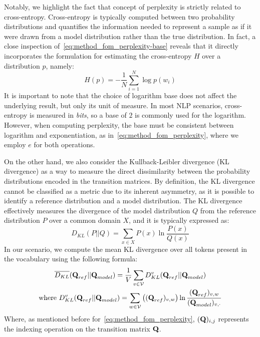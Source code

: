 Notably, we highlight the fact that concept of perplexity is strictly related to cross-entropy.
Cross-entropy is typically computed between two probability distributions and quantifies the information needed to represent a sample as if it were drawn from a model distribution rather than the true distribution.
In fact, a close inspection of~\cref{eq:method_fom_perplexity-base} reveals that it directly incorporates the formulation for estimating the cross-entropy $H$ over a distribution $p$, namely:
\begin{equation*}
    H(p) = - \frac{1}{N}\sum_{i=1}^{N}{\log{p(w_i)}}
\end{equation*}
It is important to note that the choice of logarithm base does not affect the underlying result, but only its unit of measure.
In most NLP scenarios, cross-entropy is measured in \emph{bits}, so a base of $2$ is commonly used for the logarithm.
However, when computing perplexity, the base must be consistent between logarithm and exponentiation, as in~\cref{eq:method_fom_perplexity}, where we employ $e$ for both operations.

On the other hand, we also consider the Kullback-Leibler divergence (KL divergence) as a way to measure the direct dissimilarity between the probability distributions encoded in the transition matrices.
By definition, the KL divergence cannot be classified as a metric due to its inherent asymmetry, as it is possible to identify a reference distribution and a model distribution.
The KL divergence effectively measures the divergence of the model distribution $Q$ from the reference distribution $P$ over a common domain $X$, and it is typically expressed as:
\begin{equation*}
    D_{KL}(P||Q) = \sum_{x \in X}{P(x)\ln{\frac{P(x)}{Q(x)}}}
\end{equation*}
In our scenario, we compute the mean KL divergence over all tokens present in the vocabulary using the following formula:
\begin{equation}
    \label{eq:method_fom_kldiv}
    \begin{gathered}
    {\overline {D_{KL}}}(\bm{\mathbf{Q}}_{ref} || \bm{\mathbf{Q}}_{model}) = \frac{1}{V}\sum_{v \in \mathcal{V}}{D_{KL}^v(\bm{\mathbf{Q}}_{ref} || \bm{\mathbf{Q}}_{model})} \\
    \text{where}\ D_{KL}^v(\bm{\mathbf{Q}}_{ref} || \bm{\mathbf{Q}}_{model}) = \sum_{w \in \mathcal{V}}{\bigl((\bm{\mathbf{Q}}_{ref})_{v,w}\bigr)\ln{\frac{(\bm{\mathbf{Q}}_{ref})_{v,w}}{(\bm{\mathbf{Q}}_{model})_{v,\cdot}}}}
    \end{gathered}
\end{equation}
Where, as mentioned before for~\cref{eq:method_fom_perplexity}, $(\bm{\mathbf{Q}})_{i,j}$ represents the indexing operation on the transition matrix $\bm{\mathbf{Q}}$.
